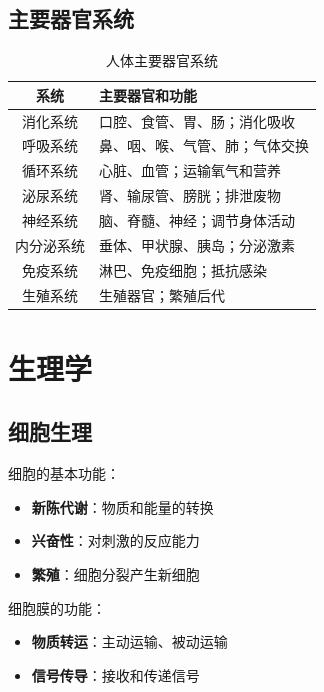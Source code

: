 \documentclass[12pt,UTF8]{ctexbook}
\begin{document}
\section{主要器官系统}
\label{sec:organ_systems}

\begin{table}[htbp]
    \centering
    \caption{人体主要器官系统}
    \begin{tabular}{|c|p{8cm}|}
        \hline
        \textbf{系统} & \textbf{主要器官和功能} \\
        \hline
        消化系统 & 口腔、食管、胃、肠；消化吸收 \\
        \hline
        呼吸系统 & 鼻、咽、喉、气管、肺；气体交换 \\
        \hline
        循环系统 & 心脏、血管；运输氧气和营养 \\
        \hline
        泌尿系统 & 肾、输尿管、膀胱；排泄废物 \\
        \hline
        神经系统 & 脑、脊髓、神经；调节身体活动 \\
        \hline
        内分泌系统 & 垂体、甲状腺、胰岛；分泌激素 \\
        \hline
        免疫系统 & 淋巴、免疫细胞；抵抗感染 \\
        \hline
        生殖系统 & 生殖器官；繁殖后代 \\
        \hline
    \end{tabular}
\end{table}

\chapter{生理学}
\label{chap:physiology}

\section{细胞生理}
\label{sec:cell_physiology}

细胞的基本功能：
\begin{itemize}
    \item \textbf{新陈代谢}：物质和能量的转换
    \item \textbf{兴奋性}：对刺激的反应能力
    \item \textbf{繁殖}：细胞分裂产生新细胞
\end{itemize}

细胞膜的功能：
\begin{itemize}
    \item \textbf{物质转运}：主动运输、被动运输
    \item \textbf{信号传导}：接收和传递信号
\end{itemize}
\end{document}
